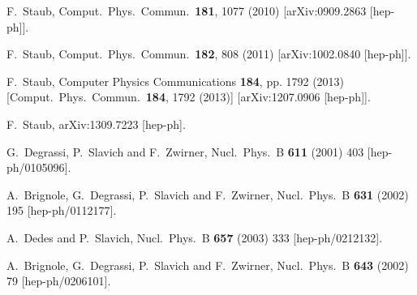 \documentclass[final,3p,11pt,pdflatex]{elsarticle}
\begin{document}
\begin{thebibliography}{100}
  F.~Staub,
  Comput.\ Phys.\ Commun.\  {\bf 181}, 1077 (2010)
  [arXiv:0909.2863 [hep-ph]].

  F.~Staub,
  Comput.\ Phys.\ Commun.\  {\bf 182}, 808 (2011)
  [arXiv:1002.0840 [hep-ph]].

  F.~Staub,
  Computer Physics Communications {\bf 184}, pp. 1792 (2013)
  [Comput.\ Phys.\ Commun.\  {\bf 184}, 1792 (2013)]
  [arXiv:1207.0906 [hep-ph]].

  F.~Staub,
  arXiv:1309.7223 [hep-ph].

  G.~Degrassi, P.~Slavich and F.~Zwirner,
  Nucl.\ Phys.\ B {\bf 611} (2001) 403
  [hep-ph/0105096].

  A.~Brignole, G.~Degrassi, P.~Slavich and F.~Zwirner,
  Nucl.\ Phys.\ B {\bf 631} (2002) 195
  [hep-ph/0112177].

  A.~Dedes and P.~Slavich,
  Nucl.\ Phys.\ B {\bf 657} (2003) 333
  [hep-ph/0212132].

  A.~Brignole, G.~Degrassi, P.~Slavich and F.~Zwirner,
  Nucl.\ Phys.\ B {\bf 643} (2002) 79
  [hep-ph/0206101].


\end{thebibliography}
\end{document}
